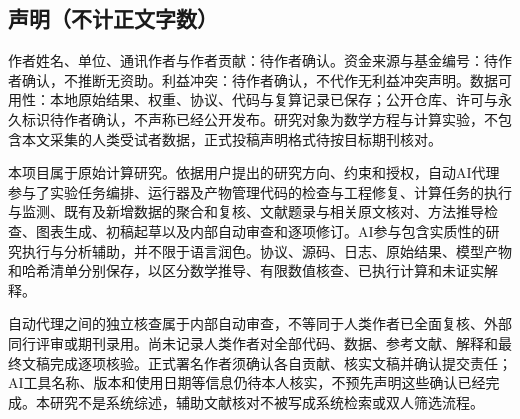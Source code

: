 \documentclass[11pt,a4paper]{article}
\begin{document}
\subsection{声明（不计正文字数）}\label{ux58f0ux660eux4e0dux8ba1ux6b63ux6587ux5b57ux6570}

作者姓名、单位、通讯作者与作者贡献：待作者确认。资金来源与基金编号：待作者确认，不推断无资助。利益冲突：待作者确认，不代作无利益冲突声明。数据可用性：本地原始结果、权重、协议、代码与复算记录已保存；公开仓库、许可与永久标识待作者确认，不声称已经公开发布。研究对象为数学方程与计算实验，不包含本文采集的人类受试者数据，正式投稿声明格式待按目标期刊核对。

本项目属于原始计算研究。依据用户提出的研究方向、约束和授权，自动AI代理参与了实验任务编排、运行器及产物管理代码的检查与工程修复、计算任务的执行与监测、既有及新增数据的聚合和复核、文献题录与相关原文核对、方法推导检查、图表生成、初稿起草以及内部自动审查和逐项修订。AI参与包含实质性的研究执行与分析辅助，并不限于语言润色。协议、源码、日志、原始结果、模型产物和哈希清单分别保存，以区分数学推导、有限数值核查、已执行计算和未证实解释。

自动代理之间的独立核查属于内部自动审查，不等同于人类作者已全面复核、外部同行评审或期刊录用。尚未记录人类作者对全部代码、数据、参考文献、解释和最终文稿完成逐项核验。正式署名作者须确认各自贡献、核实文稿并确认提交责任；AI工具名称、版本和使用日期等信息仍待本人核实，不预先声明这些确认已经完成。本研究不是系统综述，辅助文献核对不被写成系统检索或双人筛选流程。
\end{document}
